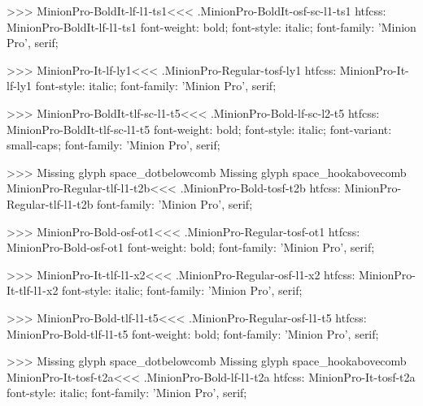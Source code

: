 {>>>
\<MinionPro-BoldIt-lf-l1-ts1\><<<
.MinionPro-BoldIt-osf-sc-l1-ts1
htfcss:  MinionPro-BoldIt-lf-l1-ts1  font-weight: bold; font-style: italic; font-family: 'Minion Pro', serif;

>>>
\<MinionPro-It-lf-ly1\><<<
.MinionPro-Regular-tosf-ly1
htfcss:  MinionPro-It-lf-ly1  font-style: italic; font-family: 'Minion Pro', serif;

>>>
\<MinionPro-BoldIt-tlf-sc-l1-t5\><<<
.MinionPro-Bold-lf-sc-l2-t5
htfcss:  MinionPro-BoldIt-tlf-sc-l1-t5  font-weight: bold; font-style: italic; font-variant: small-caps; font-family: 'Minion Pro', serif;

>>>
Missing glyph	space_dotbelowcomb
Missing glyph	space_hookabovecomb
\<MinionPro-Regular-tlf-l1-t2b\><<<
.MinionPro-Bold-tosf-t2b
htfcss:  MinionPro-Regular-tlf-l1-t2b  font-family: 'Minion Pro', serif;

>>>
\<MinionPro-Bold-osf-ot1\><<<
.MinionPro-Regular-tosf-ot1
htfcss:  MinionPro-Bold-osf-ot1  font-weight: bold; font-family: 'Minion Pro', serif;

>>>
\<MinionPro-It-tlf-l1-x2\><<<
.MinionPro-Regular-osf-l1-x2
htfcss:  MinionPro-It-tlf-l1-x2  font-style: italic; font-family: 'Minion Pro', serif;

>>>
\<MinionPro-Bold-tlf-l1-t5\><<<
.MinionPro-Regular-osf-l1-t5
htfcss:  MinionPro-Bold-tlf-l1-t5  font-weight: bold; font-family: 'Minion Pro', serif;

>>>
Missing glyph	space_dotbelowcomb
Missing glyph	space_hookabovecomb
\<MinionPro-It-tosf-t2a\><<<
.MinionPro-Bold-lf-l1-t2a
htfcss:  MinionPro-It-tosf-t2a  font-style: italic; font-family: 'Minion Pro', serif;

}
